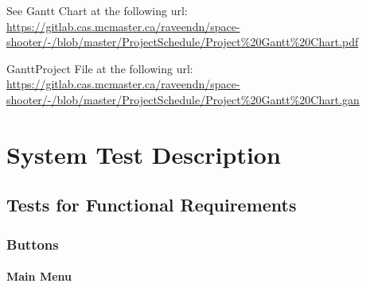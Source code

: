 \documentclass[12pt, titlepage]{article}
\begin{document}
See Gantt Chart at the following url: \url{https://gitlab.cas.mcmaster.ca/raveendn/space-shooter/-/blob/master/ProjectSchedule/Project%20Gantt%20Chart.pdf}

GanttProject File at the following url:
\url{https://gitlab.cas.mcmaster.ca/raveendn/space-shooter/-/blob/master/ProjectSchedule/Project%20Gantt%20Chart.gan}

\section{System Test Description}
	
\subsection{Tests for Functional Requirements}

\subsubsection{Buttons}

\paragraph{Main Menu}
\end{document}
